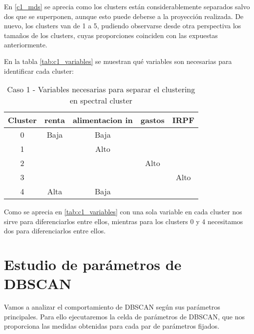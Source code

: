 En \eqref{c1_mds} se aprecia como los clusters están considerablemente separados salvo dos que se superponen, aunque esto puede deberse a la proyección realizada. De nuevo, los clusters van de 1 a 5, pudiendo observarse desde otra perspectiva los tamaños de los clusters, cuyas proporciones coinciden con las expuestas anteriormente.


En la tabla  \eqref{tab:c1_variables} se muestran qué variables son necesarias para identificar cada cluster:

\begin{table}[H]
\centering
\caption{Caso 1 - Variables necesarias para separar el clustering en spectral cluster}
\label{tab:c1_variables}
\begin{tabular}{ccccc}
\toprule
 Cluster & renta & alimentacion in & gastos & IRPF \\
\midrule
0 & Baja & Baja & & \\
1 & & Alto & & \\
2 & & & Alto & \\
3 & & & & Alto \\
4 & Alta & Baja & & \\
\bottomrule
\end{tabular}
\end{table}
Como se aprecia en \eqref{tab:c1_variables} con una sola variable en cada cluster nos sirve para diferenciarlos entre ellos, mientras para los clusters 0 y 4 necesitamos dos para diferenciarlos entre ellos.

\section{Estudio de parámetros de DBSCAN}

Vamos a analizar el comportamiento de DBSCAN según sus parámetros principales. Para ello ejecutaremos la celda de parámetros de DBSCAN, que nos proporciona las medidas obtenidas para cada par de parámetros fijados.

